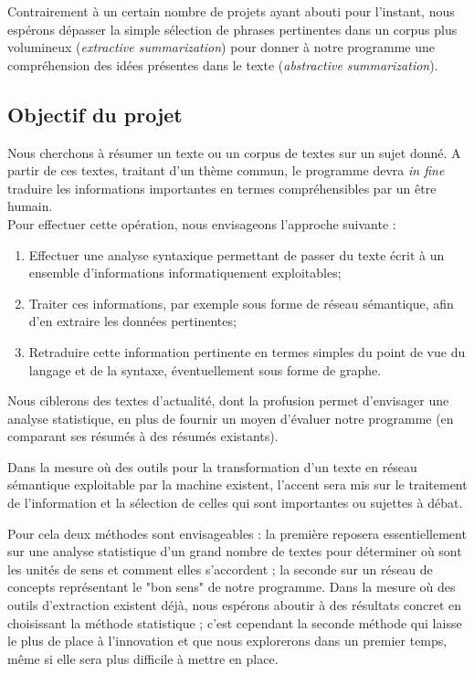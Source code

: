 \documentclass{article}           %
\begin{document}
Contrairement à un certain nombre de projets ayant abouti pour l'instant, nous espérons dépasser la simple sélection de phrases pertinentes dans un corpus plus volumineux (\textit{extractive summarization}) pour donner à notre programme une compréhension des idées présentes dans le texte (\textit{abstractive summarization}).

\subsection{Objectif du projet}
Nous cherchons à résumer un texte ou un corpus de textes sur un sujet donné. A partir de ces textes, traitant d'un thème commun, le programme devra \textit{in fine} traduire les informations importantes en termes compréhensibles par un être humain.\\

Pour effectuer cette opération, nous envisageons l'approche suivante :\\
\begin{enumerate}
 \item Effectuer une analyse syntaxique permettant de passer du texte écrit à un ensemble d'informations informatiquement exploitables;
 \item Traiter ces informations, par exemple sous forme de réseau sémantique, afin d'en extraire les données pertinentes;
 \item Retraduire cette information pertinente en termes simples du point de vue du langage et de la syntaxe, éventuellement sous forme de graphe.
\end{enumerate}

Nous ciblerons des textes d'actualité, dont la profusion permet d'envisager une analyse statistique, en plus de fournir un moyen d'évaluer notre programme (en comparant ses résumés à des résumés existants).

Dans la mesure où des outils pour la transformation d'un texte en réseau sémantique exploitable par la machine existent, l'accent sera mis sur le traitement de l'information et la sélection de celles qui sont importantes ou sujettes à débat.

Pour cela deux méthodes sont envisageables : la première reposera essentiellement sur une analyse statistique d'un grand nombre de textes pour déterminer où sont les unités de sens et comment elles s'accordent ; la seconde sur un réseau de concepts représentant le "bon sens" de notre programme. Dans la mesure où des outils d'extraction existent déjà, nous espérons aboutir à des résultats concret en choisissant la méthode statistique ; c'est cependant la seconde méthode qui laisse le plus de place à l'innovation et que nous explorerons dans un premier temps, m\^{e}me si elle sera plus difficile à mettre en place. 
\end{document}
